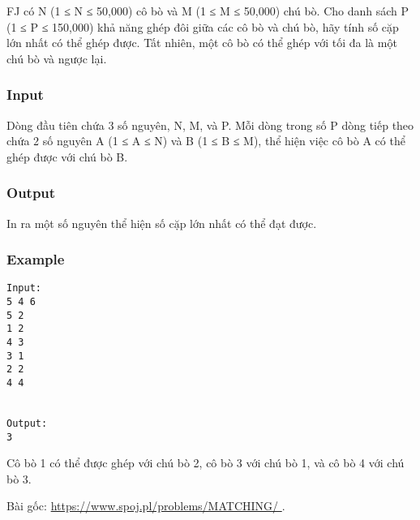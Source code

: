 



   FJ có N (1 ≤ N ≤ 50,000) cô bò và M (1 ≤ M ≤ 50,000) chú bò. Cho danh sách P (1 ≤ P ≤ 150,000) khả năng ghép đôi giữa các cô bò và chú bò, hãy tính số cặp lớn nhất có thể ghép được. Tất nhiên, một cô bò có thể ghép với tối đa là một chú bò và ngược lại.  

\subsubsection{   Input  }

   Dòng đầu tiên chứa 3 số nguyên, N, M, và P. Mỗi dòng trong số P dòng tiếp theo chứa 2 số nguyên A (1 ≤ A ≤ N) và B (1 ≤ B ≤ M), thể hiện việc cô bò A có thể ghép được với chú bò B.  

\subsubsection{   Output  }

   In ra một số nguyên thể hiện số cặp lớn nhất có thể đạt được.  

\subsubsection{   Example  }
\begin{verbatim}
Input:
5 4 6
5 2
1 2
4 3
3 1
2 2
4 4


Output:
3

\end{verbatim}

   Cô bò 1 có thể được ghép với chú bò 2, cô bò 3 với chú bò 1, và cô bò 4 với chú bò 3.  

   Bài gốc:   \href{https://www.spoj.pl/problems/MATCHING/}{    https://www.spoj.pl/problems/MATCHING/   }   .  